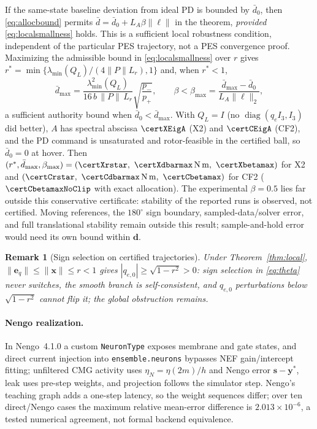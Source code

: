 \documentclass[letterpaper, 10 pt, conference]{ieeeconf}
\newtheorem{remark}{Remark}
\begin{document}
If the same-state baseline deviation from ideal PD is bounded by $\bar d_0$,
then \eqref{eq:allocbound} permits
$\bar d=\bar d_0+L_A\beta\|\bm\ell\|$ in the theorem, \emph{provided}
\eqref{eq:localsmallness} holds. This is a sufficient local robustness
condition, independent of the particular PES trajectory, not a PES
convergence proof. Maximizing the admissible bound in
\eqref{eq:localsmallness} over $r$ gives
$r^*=\min\{\lambda_{\min}(Q_L)/(4\|P\|L_r),1\}$ and, when $r^*<1$,
\begin{equation}
 \bar d_{\max}=\frac{\lambda_{\min}^2(Q_L)}{16\,b\,\|P\|\,L_r}
 \sqrt{\frac{p_-}{p_+}},\qquad
 \beta<\beta_{\max}=\frac{\bar d_{\max}-\bar d_0}{L_A\|\bm\ell\|_2},
 \label{eq:betamax}
\end{equation}
a sufficient authority bound when $\bar d_0<\bar d_{\max}$. With $Q_L=I$
(no $\operatorname{diag}(q_eI_3,I_3)$ did better), $A$ has spectral abscissa
$\certXEigA$ (X2) and $\certCEigA$ (CF2), and the PD command is unsaturated
and rotor-feasible in the certified ball, so $\bar d_0=0$ at hover. Then
$(r^*,\bar d_{\max},\beta_{\max})=(\certXrstar,\ \certXdbarmax\,\mathrm{N\,m},\
\certXbetamax)$ for X2 and $(\certCrstar,\ \certCdbarmax\,\mathrm{N\,m},\
\certCbetamax)$ for CF2 ($\certCbetamaxNoClip$ with exact allocation). The
experimental $\beta=0.5$ lies far outside this conservative certificate:
stability of the reported runs is observed, not certified. Moving references, the $180^\circ$
sign boundary, sampled-data/solver error, and full translational stability
remain outside this result; sample-and-hold error would need its own
bound within $\bm d$.

\begin{remark}[Sign selection on certified trajectories]
Under Theorem~\ref{thm:local}, $\|\bm e_q\|\le\|\bm x\|\le r<1$ gives
$|q_{e,0}|\ge\sqrt{1-r^2}>0$: sign selection in \eqref{eq:theta} never
switches, the smooth branch is self-consistent, and $q_{e,0}$ perturbations
below $\sqrt{1-r^2}$ cannot flip it; the global obstruction
\cite{bhat2000topological} remains.
\end{remark}

\paragraph{Nengo realization.}
In Nengo~4.1.0 a custom \texttt{NeuronType} exposes membrane and gate states, and direct current injection into \texttt{ensemble.neurons} bypasses NEF gain/intercept fitting; unfiltered CMG activity uses $\eta_N=\eta(2m)/h$ and Nengo error $\bm s-\bm y^*$, leak uses pre-step weights, and projection follows the simulator step. Nengo's teaching graph adds a one-step latency, so the weight sequences differ; over ten direct/Nengo cases the maximum relative mean-error difference is $2.013\times10^{-6}$, a tested numerical agreement, not formal backend equivalence.
\end{document}

